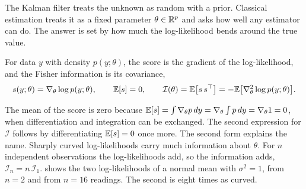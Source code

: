 The Kalman filter treats the unknown as random with a prior. Classical
estimation treats it as a fixed parameter $\theta\in\mathbb{R}^p$ and asks how well any
estimator can do. The answer is set by how much the log-likelihood bends
around the true value.

\begin{definition}\label{def:ch02:fisher}
For data $y$ with density $p(y;\theta)$, the score is the gradient of the
log-likelihood, and the Fisher information is its covariance,
\begin{equation}\label{eq:ch02:fisher}
s(y;\theta)=\nabla_\theta\log p(y;\theta),\qquad
\mathbb{E}[s]=0,\qquad
\mathcal I(\theta)=\mathbb{E}\big[s\,s^{\top}\big]=-\mathbb{E}\big[\nabla^2_\theta\log p(y;\theta)\big].
\end{equation}
\end{definition}

The mean of the score is zero because
$\mathbb{E}[s]=\int\nabla_\theta p\,dy=\nabla_\theta\int p\,dy=\nabla_\theta1=0$, when
differentiation and integration can be exchanged. The second expression for
$\mathcal I$ follows by differentiating $\mathbb{E}[s]=0$ once more. The second form
explains the name. Sharply curved log-likelihoods carry much information
about $\theta$. For $n$ independent observations the log-likelihoods add, so the
information adds, $\mathcal I_n=n\,\mathcal I_1$.  shows
the two log-likelihoods of a normal mean with $\sigma^2=1$, from $n=2$ and
from $n=16$ readings. The second is eight times as curved.

